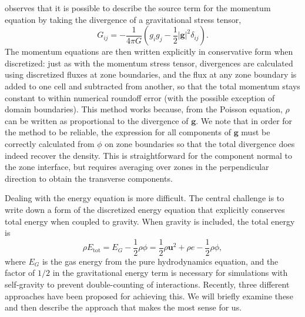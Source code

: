 \documentclass[12pt,preprint]{aastex}
\begin{document}
\citet[Chapter 4]{shu:1992} observes that it is possible to describe the source term for the momentum equation by taking the divergence of a gravitational stress tensor,
\begin{equation}
  G_{ij} = -\frac{1}{4\pi G}\left(g_i g_j - \frac{1}{2}|\mathbf{g}|^2\delta_{ij}\right).
\end{equation}
The momentum equations are then written explicitly in conservative form when discretized: just as with the momentum stress tensor, divergences are calculated using discretized fluxes at zone boundaries, and the flux at any zone boundary is added to one cell and subtracted from another, so that the total momentum stays constant to within numerical roundoff error (with the possible exception of domain boundaries). This method works because, from the Poisson equation, $\rho$ can be written as proportional to the divergence of $\mathbf{g}$. We note that in order for the method to be reliable, the expression for all components of $\mathbf{g}$ must be correctly calculated from $\phi$ on zone boundaries so that the total divergence does indeed recover the density. This is straightforward for the component normal to the zone interface, but requires averaging over zones in the perpendicular direction to obtain the transverse components.

Dealing with the energy equation is more difficult. The central challenge is to write down a form of the discretized energy equation that explicitly conserves total energy when coupled to gravity. When gravity is included, the total energy is
\begin{equation}
  \rho E_{\text{tot}} = E_G - \frac{1}{2}\rho\phi = \frac{1}{2}\rho \mathbf{u}^2 + \rho e - \frac{1}{2}\rho\phi,
\end{equation}
where $E_G$ is the gas energy from the pure hydrodynamics equation, and the factor of $1/2$ in the gravitational energy term is necessary for simulations with self-gravity to prevent double-counting of interactions. Recently, three different approaches have been proposed for achieving this. We will briefly examine these and then describe the approach that makes the most sense for us.
\end{document}
